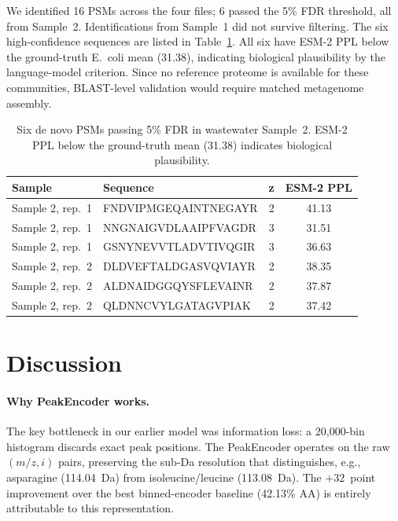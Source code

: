 \documentclass[11pt]{article}
\begin{document}
We identified 16 PSMs across the four files; 6 passed the 5\% FDR threshold,
all from Sample~2. Identifications from Sample~1 did not survive filtering. The six
high-confidence sequences are listed in Table~\ref{tab:ww_seqs}. All six have ESM-2
PPL below the ground-truth E.~coli mean (31.38), indicating biological plausibility
by the language-model criterion. Since no reference proteome is available for these
communities, BLAST-level validation would require matched metagenome assembly.

\begin{table}[H]
\centering
\caption{Six de novo PSMs passing 5\% FDR in wastewater Sample~2.
  ESM-2 PPL below the ground-truth mean (31.38) indicates biological plausibility.}
\label{tab:ww_seqs}
\begin{tabular}{llcc}
\toprule
\textbf{Sample} & \textbf{Sequence} & \textbf{z} & \textbf{ESM-2 PPL} \\
\midrule
Sample 2, rep.\ 1 & FNDVIPMGEQAINTNEGAYR & 2 & 41.13 \\
Sample 2, rep.\ 1 & NNGNAIGVDLAAIPFVAGDR & 3 & 31.51 \\
Sample 2, rep.\ 1 & GSNYNEVVTLADVTIVQGIR & 3 & 36.63 \\
Sample 2, rep.\ 2 & DLDVEFTALDGASVQVIAYR & 2 & 38.35 \\
Sample 2, rep.\ 2 & ALDNAIDGGQYSFLEVAINR & 2 & 37.87 \\
Sample 2, rep.\ 2 & QLDNNCVYLGATAGVPIAK  & 2 & 37.42 \\
\bottomrule
\end{tabular}
\end{table}

\section{Discussion}

\paragraph{Why PeakEncoder works.}
The key bottleneck in our earlier model was information loss: a 20,000-bin histogram
discards exact peak positions. The PeakEncoder operates on the raw $(m/z, i)$ pairs,
preserving the sub-Da resolution that distinguishes, e.g., asparagine (114.04~Da)
from isoleucine/leucine (113.08~Da). The $+32$~point improvement over the best
binned-encoder baseline (42.13\% AA) is entirely attributable to this representation.
\end{document}
